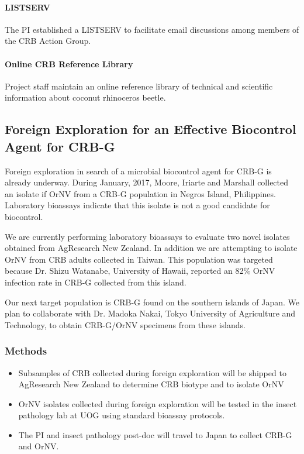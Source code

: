 \documentclass[12pt,letterpaper,english,bibliography=totocnumbered,abstract=on]{scrartcl}
\begin{document}
\paragraph{LISTSERV}
The PI established a LISTSERV to facilitate email discussions among members of the CRB Action Group.\cite{mooreOnlineEmailDiscussion2021}

\paragraph{Online CRB Reference Library}
Project staff maintain an online reference library of technical and scientific information about coconut rhinoceros beetle.\cite{mooreOnlineReferenceLibrary2021}


\newpage
\begin{framed}
\subsection{Foreign Exploration for an Effective Biocontrol Agent for CRB-G}

Foreign exploration in search of a microbial biocontrol agent for CRB-G is already underway. During January, 2017, Moore, Iriarte and Marshall collected an isolate if OrNV from a CRB-G population in Negros Island, Philippines. Laboratory bioassays indicate that this isolate is not a good candidate for biocontrol.

We are currently performing laboratory bioassays to evaluate two novel isolates obtained from AgResearch New Zealand. In addition we are attempting to isolate OrNV from CRB adults collected in Taiwan. This population was targeted because Dr. Shizu Watanabe, University of Hawaii, reported an 82\% OrNV infection rate in CRB-G collected from this island.

Our next target population is CRB-G found on the southern islands of Japan. We plan to collaborate with Dr. Madoka Nakai, Tokyo University of Agriculture and Technology, to obtain CRB-G/OrNV specimens from these islands.

\subsubsection{Methods}

\begin{itemize}
	\item Subsamples of CRB collected during foreign exploration will be shipped to AgResearch New Zealand to determine CRB biotype and to isolate OrNV
	\item OrNV isolates collected during foreign exploration will be tested in the insect pathology lab at UOG using standard bioassay protocols.
	\item The PI and insect pathology post-doc will travel to Japan to collect CRB-G and OrNV. 
\end{itemize}
\end{framed}
\end{document}

